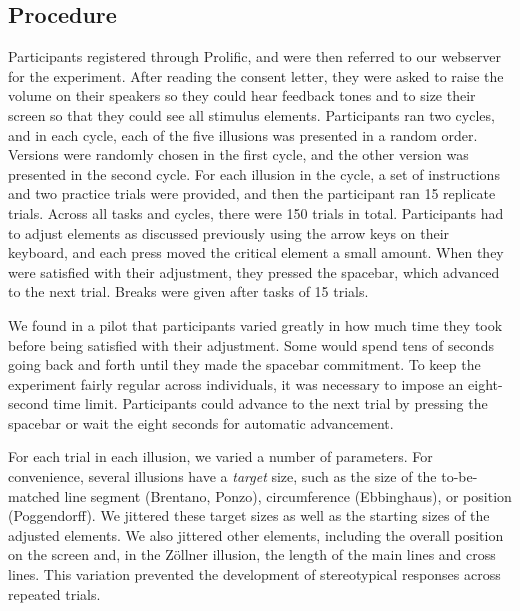 \subsection*{Procedure}

Participants registered through Prolific, and were then referred to our webserver for the experiment. After reading the consent letter, they were asked to raise the volume on their speakers so they could hear feedback tones and to size their screen so that they could see all stimulus elements.  Participants ran two cycles, and in each cycle, each of the five illusions was presented in a random order. Versions were randomly chosen in the first cycle, and the other version was presented in the second cycle. For each illusion in the cycle, a set of instructions and two practice trials were provided, and then the participant ran 15 replicate trials. Across all tasks and cycles, there were 150 trials in total. Participants had to adjust elements as discussed previously using the arrow keys on their keyboard, and each press moved the critical element a small amount. When they were satisfied with their adjustment, they pressed the spacebar, which advanced to the next trial. Breaks were given after tasks of 15 trials.

We found in a pilot that participants varied greatly in how much time they took before being satisfied with their adjustment. Some would spend tens of seconds going back and forth until they made the spacebar commitment. To keep the experiment fairly regular across individuals, it was necessary to impose an eight-second time limit. Participants could advance to the next trial by pressing the spacebar or wait the eight seconds for automatic advancement.

For each trial in each illusion, we varied a number of parameters. For convenience, several illusions have a \textit{target} size, such as the size of the to-be-matched line segment (Brentano, Ponzo), circumference (Ebbinghaus), or position (Poggendorff). We jittered these target sizes as well as the starting sizes of the adjusted elements. We also jittered other elements, including the overall position on the screen and, in the Zöllner illusion, the length of the main lines and cross lines. This variation prevented the development of stereotypical responses across repeated trials.
